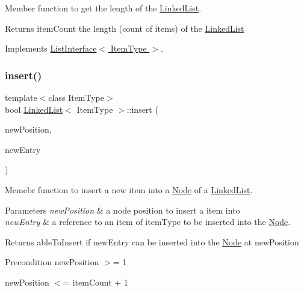 Member function to get the length of the \hyperlink{classLinkedList}{Linked\+List}. 

\begin{DoxyReturn}{Returns}
item\+Count the length (count of items) of the \hyperlink{classLinkedList}{Linked\+List} 
\end{DoxyReturn}


Implements \hyperlink{classListInterface_afc85695d4137f1e29ff02e179c9f3221}{List\+Interface$<$ Item\+Type $>$}.

\mbox{\label{classLinkedList_ae8a19375505e87e2e4fc0e9b5afe4d4d}} 
\subsubsection{\texorpdfstring{insert()}{insert()}}
{\footnotesize\ttfamily template$<$class Item\+Type$>$ \\
bool \hyperlink{classLinkedList}{Linked\+List}$<$ Item\+Type $>$\+::insert (\begin{DoxyParamCaption}\item[{int}]{new\+Position,  }\item[{const Item\+Type \&}]{new\+Entry }\end{DoxyParamCaption})\hspace{0.3cm}{\ttfamily [virtual]}}



Memebr function to insert a new item into a \hyperlink{classNode}{Node} of a \hyperlink{classLinkedList}{Linked\+List}. 


\begin{DoxyParams}{Parameters}
{\em new\+Position} & a node position to insert a item into \\
\hline
{\em new\+Entry} & a reference to an item of item\+Type to be inserted into the \hyperlink{classNode}{Node}. \\
\hline
\end{DoxyParams}
\begin{DoxyReturn}{Returns}
able\+To\+Insert if new\+Entry can be inserted into the \hyperlink{classNode}{Node} at new\+Position 
\end{DoxyReturn}
\begin{DoxyPrecond}{Precondition}
new\+Position $>$= 1 

new\+Position $<$= item\+Count + 1 
\end{DoxyPrecond}



